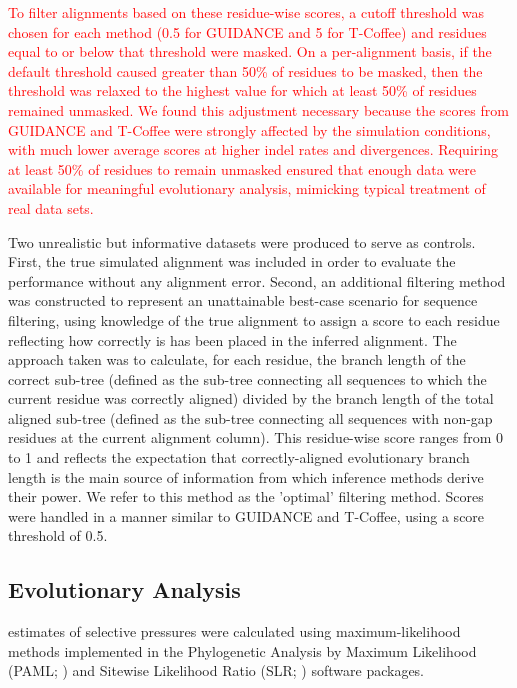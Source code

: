 \documentclass{article}
\begin{document}
\textcolor{red}{To filter alignments based on these residue-wise
  scores, a cutoff threshold was chosen for each method (0.5 for
  GUIDANCE and 5 for T-Coffee) and residues equal to or below that
  threshold were masked. On a per-alignment basis, if the default
  threshold caused greater than 50\% of residues to be masked, then
  the threshold was relaxed to the highest value for which at least
  50\% of residues remained unmasked. We found this adjustment
  necessary because the scores from GUIDANCE and T-Coffee were
  strongly affected by the simulation conditions, with much lower
  average scores at higher indel rates and divergences. Requiring at
  least 50\% of residues to remain unmasked ensured that enough data
  were available for meaningful evolutionary analysis, mimicking
  typical treatment of real data sets.}

Two unrealistic but informative datasets were produced to serve as controls. First,
the true simulated alignment was included in order to evaluate the \sw
performance without any alignment error. Second, an additional
filtering method was constructed to represent an unattainable
best-case scenario for sequence filtering, using knowledge of the true
alignment to assign a score to each residue reflecting how correctly
is has been placed in the inferred alignment. The approach taken was
to calculate, for each residue, the branch length of the correct
sub-tree (defined as the sub-tree connecting all sequences to which
the current residue was correctly aligned) divided by the branch
length of the total aligned sub-tree (defined as the sub-tree
connecting all sequences with non-gap residues at the current
alignment column). This residue-wise score ranges from 0 to 1 and
reflects the expectation that correctly-aligned evolutionary branch
length is the main source of information from which \sw inference
methods derive their power. We refer to this method as the 'optimal'
filtering method. Scores were handled in a manner similar to GUIDANCE and
T-Coffee, using a score threshold of 0.5.

\subsection*{\Sw Evolutionary Analysis}

\Sw estimates of selective pressures were calculated using
maximum-likelihood methods implemented in the Phylogenetic Analysis by
Maximum Likelihood (PAML; \citealt{Yang2007PAML}) and Sitewise Likelihood Ratio
(SLR; \citealt{Massingham2005Detecting}) software packages.
\end{document}
